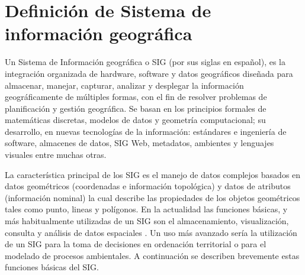 \section{Definición de Sistema de información geográfica}
\label{sec:cap2-definicion-sig}

Un Sistema de Información geográfica o SIG (por sus siglas en español), es la integración
organizada de hardware, software y datos geográficos diseñada para almacenar, manejar, capturar,
analizar y desplegar la información geográficamente de múltiples formas, con el fin de resolver
problemas de planificación y gestión geográfica\cite{lopezMarcos2007}. Se basan en los principios
formales de matemáticas discretas, modelos de datos y geometría computacional; su desarrollo, en
nuevas tecnologías de la información: estándares e ingeniería de software, almacenes de datos,
SIG Web, metadatos, ambientes y lenguajes visuales entre muchas otras\cite{lunaPaulina2010}.

La característica principal de los SIG es el manejo de datos complejos basados en datos
geométricos (coordenadas e información topológica) y datos de atributos (información nominal) la
cual describe las propiedades de los objetos geométricos tales como punto, lineas y polígonos. En
la actualidad las funciones básicas, y más habitualmente utilizadas de un SIG son el
almacenamiento, visualización, consulta y análisis de datos espaciales \cite{fAlonsoSig2006}. Un
uso más avanzado sería la utilización de un SIG para la toma de decisiones en ordenación
territorial o para el modelado de procesos ambientales. A continuación se describen brevemente
estas funciones básicas del SIG.

